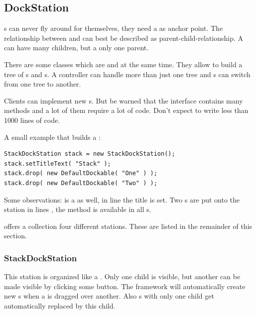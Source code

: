 \subsection{DockStation}
s can never fly around for themselves, they need a  as anchor point. The relationship between  and  can best be described as parent-child-relationship. A  can have many children, but a  only one parent.

There are some classes which are  and  at the same time. They allow to build a tree of s and s. A controller can handle more than just one tree and s can switch from one tree to another.

Clients can implement new s. But be warned that the interface contains many methods and a lot of them require a lot of code. Don't expect to write less than 1000 lines of code.

A small example that builds a :
\begin{lstlisting}
StackDockStation stack = new StackDockStation();
stack.setTitleText( "Stack" );
stack.drop( new DefaultDockable( "One" ) );
stack.drop( new DefaultDockable( "Two" ) );
\end{lstlisting}
Some observations:  is a  as well, in line  the title is set. Two s are put onto the station in lines , the method  is available in all s.


 offers a collection four different stations. These are listed in the remainder of this section.

\subsubsection{StackDockStation}
This station is organized like a . Only one child is visible, but another can be made visible by clicking some button. The framework will automatically create new s when a  is dragged over another. Also s with only one child get automatically replaced by this child.

